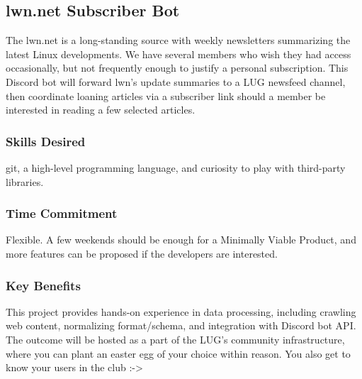 \subsection{lwn.net Subscriber Bot}

The lwn.net is a long-standing source with weekly newsletters summarizing the latest Linux developments. We have several members who wish they had access occasionally, but not frequently enough to justify a personal subscription. This Discord bot will forward lwn's update summaries to a LUG newsfeed channel, then coordinate loaning articles via a subscriber link should a member be interested in reading a few selected articles.

\subsubsection*{Skills Desired}

git, a high-level programming language, and curiosity to play with third-party libraries.

\subsubsection*{Time Commitment}

Flexible. A few weekends should be enough for a Minimally Viable Product, and more features can be proposed if the developers are interested.

\subsubsection*{Key Benefits}

This project provides hands-on experience in data processing, including crawling web content, normalizing format/schema, and integration with Discord bot API. The outcome will be hosted as a part of the LUG's community infrastructure, where you can plant an easter egg of your choice within reason. You also get to know your users in the club :->
